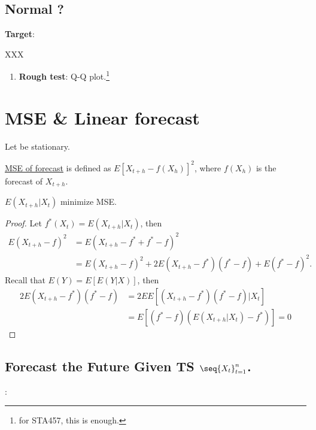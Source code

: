 \subsection{Normal ?}

\textbf{Target}:

XXX 

\begin{enumerate}
    \item \textbf{Rough test}: Q-Q plot.\footnote{for STA457, this is enough.}
\end{enumerate}

\section{MSE \& Linear forecast}

Let  be stationary.

\begin{definition}
\uline{MSE of forecast} is defined as $E[X_{t+h} - f(X_h)]^2$, where $f(X_h)$ is the forecast of $X_{t+h}$.
\end{definition}

\begin{theorem}
$E(X_{t+h}|X_t)$ minimize MSE.
\end{theorem}

\begin{proof}
Let $ f^*(X_t) = E(X_{t+h}|X_t)$, then
\begin{align*}
    E(X_{t+h}- f)^2 &= E(X_{t+h}- f^* + f^* - f)^2\\
    &= E(X_{t+h}- f)^2 + 2E(X_{t+h}- f^*)(f^* - f) + E( f^*-  f)^2.
\end{align*}
Recall that $E(Y) = E[E(Y|X)]$, then
\begin{align*}
    2E(X_{t+h}- f^*)( f^* - f) &= 2EE[(X_{t+h}- f^*)( f^* - f)|X_t] \\
    &= E[( f^* - f) (E(X_{t+h}|X_t) - f^*)] = 0
\end{align*}
\end{proof}

\subsection{Forecast the Future Given TS $\seq{X_t}_{t=1}^n$.}

:

